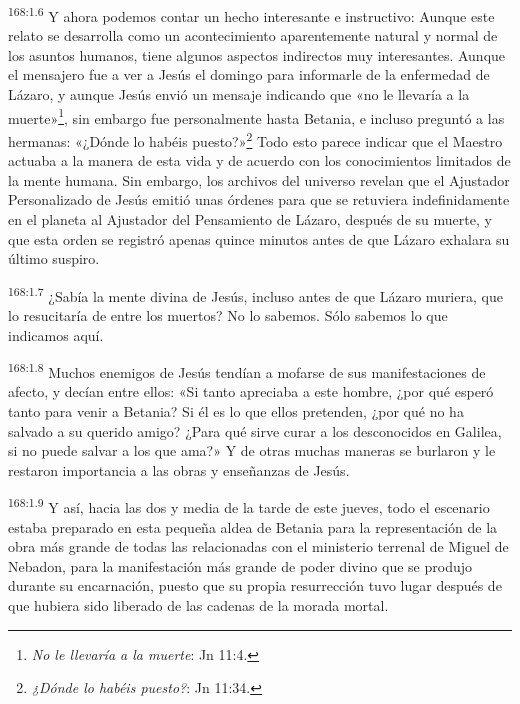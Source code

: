 \par
\textsuperscript{168:1.6} Y ahora podemos contar un hecho interesante e instructivo: Aunque este relato se desarrolla como un acontecimiento aparentemente natural y normal de los asuntos humanos, tiene algunos aspectos indirectos muy interesantes. Aunque el mensajero fue a ver a Jesús el domingo para informarle de la enfermedad de Lázaro, y aunque Jesús envió un mensaje indicando que «no le llevaría a la muerte»\footnote{\textit{No le llevaría a la muerte}: Jn 11:4.}, sin embargo fue personalmente hasta Betania, e incluso preguntó a las hermanas: «¿Dónde lo habéis puesto?»\footnote{\textit{¿Dónde lo habéis puesto?}: Jn 11:34.} Todo esto parece indicar que el Maestro actuaba a la manera de esta vida y de acuerdo con los conocimientos limitados de la mente humana. Sin embargo, los archivos del universo revelan que el Ajustador Personalizado de Jesús emitió unas órdenes para que se retuviera indefinidamente en el planeta al Ajustador del Pensamiento de Lázaro, después de su muerte, y que esta orden se registró apenas quince minutos antes de que Lázaro exhalara su último suspiro.

\par
\textsuperscript{168:1.7} ¿Sabía la mente divina de Jesús, incluso antes de que Lázaro muriera, que lo resucitaría de entre los muertos? No lo sabemos. Sólo sabemos lo que indicamos aquí.

\par
\textsuperscript{168:1.8} Muchos enemigos de Jesús tendían a mofarse de sus manifestaciones de afecto, y decían entre ellos: «Si tanto apreciaba a este hombre, ¿por qué esperó tanto para venir a Betania? Si él es lo que ellos pretenden, ¿por qué no ha salvado a su querido amigo? ¿Para qué sirve curar a los desconocidos en Galilea, si no puede salvar a los que ama?» Y de otras muchas maneras se burlaron y le restaron importancia a las obras y enseñanzas de Jesús.

\par
\textsuperscript{168:1.9} Y así, hacia las dos y media de la tarde de este jueves, todo el escenario estaba preparado en esta pequeña aldea de Betania para la representación de la obra más grande de todas las relacionadas con el ministerio terrenal de Miguel de Nebadon, para la manifestación más grande de poder divino que se produjo durante su encarnación, puesto que su propia resurrección tuvo lugar después de que hubiera sido liberado de las cadenas de la morada mortal.


